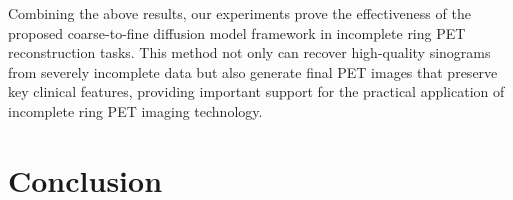 \documentclass[12pt]{iopart}
\begin{document}
Combining the above results, our experiments prove the effectiveness of the proposed coarse-to-fine diffusion model framework in incomplete ring PET reconstruction tasks. This method not only can recover high-quality sinograms from severely incomplete data but also generate final PET images that preserve key clinical features, providing important support for the practical application of incomplete ring PET imaging technology.


\section{Conclusion}
\label{chap:conclusion}

\end{document}
